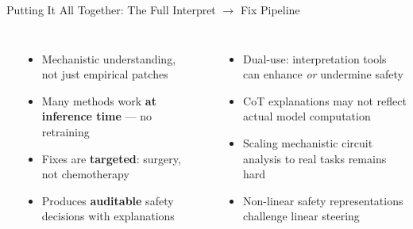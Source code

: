 \begin{frame}[fragile]{Putting It All Together: The Full Interpret $\to$ Fix Pipeline}

  \vspace{0.4em}
  \begin{columns}[T]
    {\small\bfseries{}}
    \begin{itemize}\scriptsize\setlength\itemsep{2pt}
      \item Mechanistic understanding, not just empirical patches
      \item Many methods work \textbf{at inference time} --- no retraining
      \item Fixes are \textbf{targeted}: surgery, not chemotherapy
      \item Produces \textbf{auditable} safety decisions with explanations
    \end{itemize}

    {\small\bfseries{}}
    \begin{itemize}\scriptsize\setlength\itemsep{2pt}
      \item Dual-use: interpretation tools can enhance \emph{or} undermine safety
      \item CoT explanations may not reflect actual model computation
      \item Scaling mechanistic circuit analysis to real tasks remains hard
      \item Non-linear safety representations challenge linear steering
    \end{itemize}
  \end{columns}
\end{frame}


